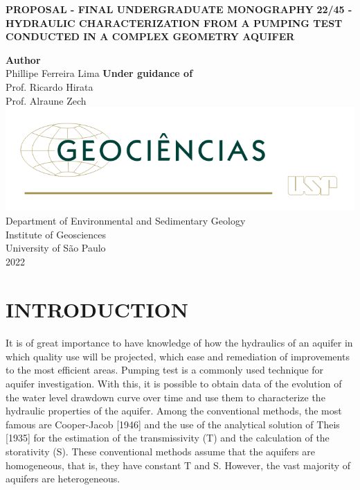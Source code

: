 \documentclass[11pt, a4paper]{article}
\begin{document}
    
    \begin{titlepage}
        \begin{center}
            
		    \textbf{PROPOSAL - FINAL UNDERGRADUATE MONOGRAPHY}
		    \vfill
		    \textbf{22/45 - HYDRAULIC CHARACTERIZATION FROM A PUMPING TEST CONDUCTED IN A COMPLEX GEOMETRY AQUIFER}
		    \vfill
		
		    \textbf{Author} \\
		    \medskip
		    Phillipe Ferreira Lima
		    \vfill
		    \textbf{Under guidance of} \\
    		\medskip
    		Prof. Ricardo Hirata \\
    		Prof. Alraune Zech
    		\vfill            
     		\includegraphics{logo-igc.png}
     		\vfill
    		Department of Environmental and Sedimentary Geology \\
    		\medskip
    		Institute of Geosciences \\
    		University of São Paulo \\
    		2022
    		\vfill
    		
    		
        \end{center}
    \end{titlepage}
    
    
    \section{INTRODUCTION}
    \paragraph{}
    It is of great importance to have knowledge of how the hydraulics of an aquifer in which quality use will be projected, which ease and remediation of improvements to the most efficient areas. Pumping test is a commonly used technique for aquifer investigation. With this, it is possible to obtain data of the evolution of the water level drawdown curve over time and use them to characterize the hydraulic properties of the aquifer. Among the conventional methods, the most famous are Cooper-Jacob [1946] and the use of the analytical solution of Theis [1935] for the estimation of the transmissivity (T) and the calculation of the storativity (S). These conventional methods assume that the aquifers are homogeneous, that is, they have constant T and S. However, the vast majority of aquifers are heterogeneous.
\end{document}
